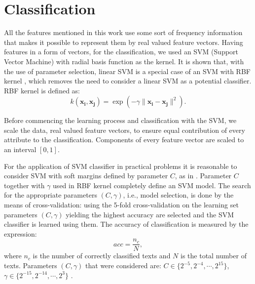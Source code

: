 \documentclass{llncs}
\begin{document}
\section{Classification}
All the features mentioned in this work use some sort of frequency information
that makes it possible to represent them by real valued feature vectors. Having
features in a form of vectors, for the classification, we used an SVM (Support
Vector Machine) with radial basis function as the kernel. It is shown that, with
the use of parameter selection, linear SVM is a special case of an SVM with RBF
kernel \cite{keerthi2003asymptotic}, which removes the need to consider a linear
SVM as a potential classifier. RBF kernel is defined as:
\begin{equation}
k(\mathbf{x_i},\mathbf{x_j})=\exp(-\gamma \|\mathbf{x_i} - \mathbf{x_j}\|^2).
\end{equation}

Before commencing the learning process and classification with the SVM, we scale
the data, real valued feature vectors, to ensure equal contribution of every attribute to
the classification. Components of every feature vector are scaled to an interval
$[0, 1]$.

For the application of SVM classifier in practical problems it is reasonable to
consider SVM with soft margins defined by parameter $C$, as in
\cite{cortes1995support}. Parameter $C$ together with $\gamma$ used in RBF kernel
completely define an SVM model. The search for the appropriate parameters $(C,
\gamma)$, i.e., model selection, is done by the means of cross-validation: using
the 5-fold cross-validation on the learning set parameters $(C, \gamma)$ yielding
the highest accuracy are selected and the SVM classifier is learned using them.
The accuracy of classification is measured by the expression:
\begin{equation}
acc = \frac{n_c}{N}, %
\end{equation}
where $n_c$ is the number of correctly classified texts and $N$ is the total number of
texts.
Parameters $(C, \gamma)$ that were considered are: $C \in \{2^{-5}, 2^{-4},
\cdots , 2^{15}\}$, $\gamma \in \{2^{-15}, 2^{-14}, \cdots, 2^3\}$ \cite{CC01a}.
\end{document}

